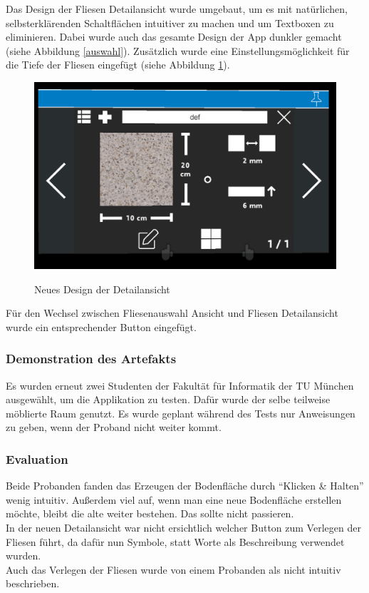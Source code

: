 Das Design der Fliesen Detailansicht wurde umgebaut, um es mit natürlichen, selbsterklärenden Schaltflächen intuitiver zu machen und um Textboxen zu eliminieren. Dabei wurde auch das gesamte Design der App dunkler gemacht (siehe Abbildung \ref{auswahl}). Zusätzlich wurde eine Einstellungsmöglichkeit für die Tiefe der Fliesen eingefügt (siehe Abbildung \ref{detail}).

\begin{figure}[h]
	\begin{center}
		\noindent\includegraphics[scale=0.4]{Resources/Artefakt/detail.png}
		\label{detail}
		\caption{Neues Design der Detailansicht}	
	\end{center}
\end{figure}

Für den Wechsel zwischen Fliesenauswahl Ansicht und Fliesen Detailansicht wurde ein entsprechender Button eingefügt.

\subsubsection{Demonstration des Artefakts}

Es wurden erneut zwei Studenten der Fakultät für Informatik der TU München ausgewählt, um die Applikation zu testen. Dafür wurde der selbe teilweise möblierte Raum genutzt. Es wurde geplant während des Tests nur Anweisungen zu geben, wenn der Proband nicht weiter kommt.

\subsubsection{Evaluation}

Beide Probanden fanden das Erzeugen der Bodenfläche durch \enquote{Klicken \& Halten} wenig intuitiv. Außerdem viel auf, wenn man eine neue Bodenfläche erstellen möchte, bleibt die alte weiter bestehen. Das sollte nicht passieren. \\
In der neuen Detailansicht war nicht ersichtlich welcher Button zum Verlegen der Fliesen führt, da dafür nun Symbole, statt Worte als Beschreibung verwendet wurden. \\
Auch das Verlegen der Fliesen wurde von einem Probanden als nicht intuitiv beschrieben.


